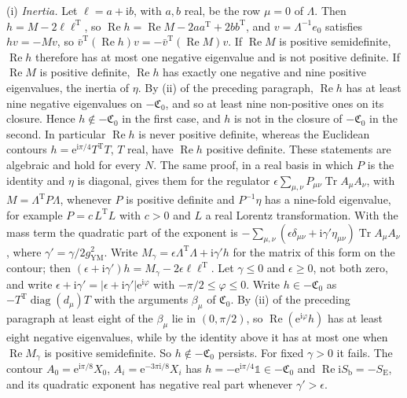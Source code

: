 (i) \emph{Inertia.} Let \(\ell=a+\mathrm ib\), with \(a,b\) real, be the row \(\mu=0\) of \(\Lambda\). Then \(h=M-2\ell\ell^{\mathrm T}\), so \(\operatorname{Re}h=\operatorname{Re}M-2aa^{\mathrm T}+2bb^{\mathrm T}\), and \(v=\Lambda^{-1}e_0\) satisfies \(hv=-Mv\), so \(\bar v^{\mathrm T}(\operatorname{Re}h)v=-\bar v^{\mathrm T}(\operatorname{Re}M)v\). If \(\operatorname{Re}M\) is positive semidefinite, \(\operatorname{Re}h\) therefore has at most one negative eigenvalue and is not positive definite. If \(\operatorname{Re}M\) is positive definite, \(\operatorname{Re}h\) has exactly one negative and nine positive eigenvalues, the inertia of \(\eta\). By (ii) of the preceding paragraph, \(\operatorname{Re}h\) has at least nine negative eigenvalues on \(-\mathfrak C_0\), and so at least nine non-positive ones on its closure. Hence \(h\notin-\mathfrak C_0\) in the first case, and \(h\) is not in the closure of \(-\mathfrak C_0\) in the second. In particular \(\operatorname{Re}h\) is never positive definite, whereas the Euclidean contours \(h=\mathrm e^{\mathrm i\pi/4}T^{\mathrm T}T\), \(T\) real, have \(\operatorname{Re}h\) positive definite. These statements are algebraic and hold for every \(N\). The same proof, in a real basis in which \(P\) is the identity and \(\eta\) is diagonal, gives them for the regulator \(\epsilon\sum_{\mu,\nu}P_{\mu\nu}\operatorname{Tr}A_\mu A_\nu\), with \(M=\Lambda^{\mathrm T}P\Lambda\), whenever \(P\) is positive definite and \(P^{-1}\eta\) has a nine-fold eigenvalue, for example \(P=c\,L^{\mathrm T}L\) with \(c>0\) and \(L\) a real Lorentz transformation. With the mass term the quadratic part of the exponent is \(-\sum_{\mu,\nu}(\epsilon\delta_{\mu\nu}+\mathrm i\gamma'\eta_{\mu\nu})\operatorname{Tr}A_\mu A_\nu\), where \(\gamma'=\gamma/2g_{\mathrm{YM}}^2\). Write \(M_\gamma=\epsilon\Lambda^{\mathrm T}\Lambda+\mathrm i\gamma'h\) for the matrix of this form on the contour; then \((\epsilon+\mathrm i\gamma')h=M_\gamma-2\epsilon\ell\ell^{\mathrm T}\). Let \(\gamma\le0\) and \(\epsilon\ge0\), not both zero, and write \(\epsilon+\mathrm i\gamma'=|\epsilon+\mathrm i\gamma'|\mathrm e^{\mathrm i\varphi}\) with \(-\pi/2\le\varphi\le0\). Write \(h\in-\mathfrak C_0\) as \(-T^{\mathrm T}\operatorname{diag}(d_\mu)T\) with the arguments \(\beta_\mu\) of \(\mathfrak C_0\). By (ii) of the preceding paragraph at least eight of the \(\beta_\mu\) lie in \((0,\pi/2)\), so \(\operatorname{Re}(\mathrm e^{\mathrm i\varphi}h)\) has at least eight negative eigenvalues, while by the identity above it has at most one when \(\operatorname{Re}M_\gamma\) is positive semidefinite. So \(h\notin-\mathfrak C_0\) persists. For fixed \(\gamma>0\) it fails. The contour \(A_0=\mathrm e^{\mathrm i\pi/8}X_0\), \(A_i=\mathrm e^{-3\pi\mathrm i/8}X_i\) has \(h=-\mathrm e^{\mathrm i\pi/4}\mathbb 1\in-\mathfrak C_0\) and \(\operatorname{Re}\mathrm iS_{\mathrm b}=-S_{\mathrm E}\), and its quadratic exponent has negative real part whenever \(\gamma'>\epsilon\).

